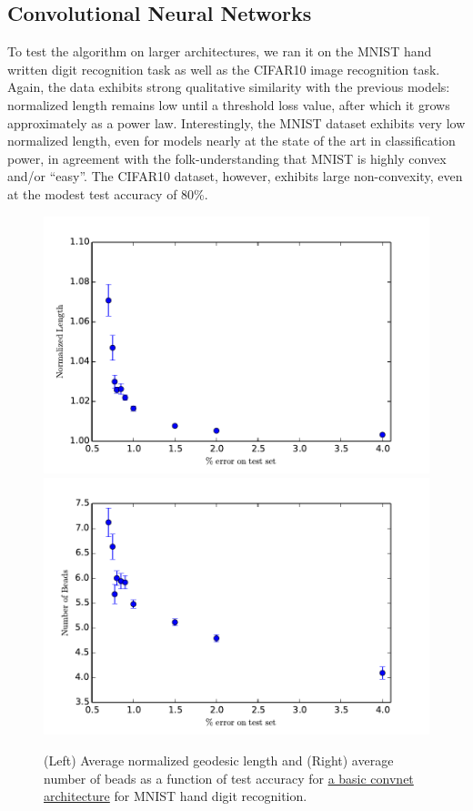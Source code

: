 \subsection{Convolutional Neural Networks}
\label{sec:CNN}

 To test the algorithm on larger architectures, we ran it on the MNIST hand written digit recognition task as well as the CIFAR10 image recognition task.  Again, the data exhibits strong qualitative similarity with the previous models: normalized length remains low until a threshold loss value, after which it grows approximately as a power law.  Interestingly, the MNIST dataset exhibits very low normalized length, even for models nearly at the state of the art in classification power, in agreement with the folk-understanding that MNIST is highly convex and/or ``easy''.  The CIFAR10 dataset, however, exhibits large non-convexity, even at the modest test accuracy of 80\%.

\begin{figure}
\label{MNISTfigs}
\centering
\includegraphics[width=.4\textwidth]{../Plots/normlengthMNIST}
\includegraphics[width=.4\textwidth]{../Plots/numbeadsMNIST}
\caption{(Left) Average normalized geodesic length and (Right) average number of beads as a function of test accuracy for \href{github.com/danielfreeman11/convex-nets/tree/master/LaunchScripts/MNIST.ipynb}{a basic convnet architecture} for MNIST hand digit recognition.}
\end{figure}


